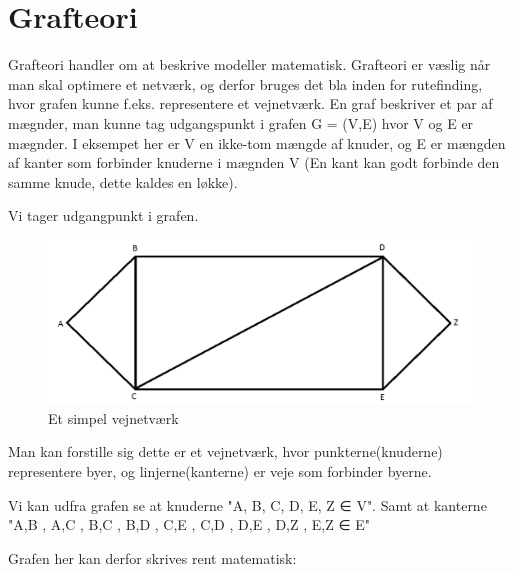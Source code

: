 \section{Grafteori}

Grafteori handler om at beskrive  modeller matematisk. Grafteori er væslig når man skal optimere et netværk, og derfor bruges det bla inden for rutefinding, hvor grafen kunne f.eks. representere et vejnetværk. 
En graf beskriver et par af mægnder, man kunne tag udgangspunkt i grafen G = (V,E) hvor V og E er mægnder. I eksempet her er V en ikke-tom mængde af knuder, og E er mængden af kanter som forbinder knuderne i mægnden V (En kant kan godt forbinde den samme knude, dette kaldes en løkke). 

\vspace{5mm}

Vi tager udgangpunkt i grafen.

\begin{figure}[H]
\begin{adjustbox}{width=1.2\textwidth,center=\textwidth}
\centering
\includegraphics[width=1.2\textwidth]{Pictures/Teoriafsnit/Figurfiler/Grafteori_graf.png}
\end{adjustbox}
\caption{Et simpel vejnetværk}
\label{fig:grafteori}
\end{figure}

Man kan forstille sig dette er et vejnetværk, hvor punkterne(knuderne) representere byer, og linjerne(kanterne) er veje som forbinder byerne.

\vspace{5mm}

Vi kan udfra grafen se at knuderne "A, B, C, D, E, Z ∈ V". Samt at kanterne "{A,B} , {A,C} , {B,C} , {B,D} , {C,E} , {C,D} , {D,E} , {D,Z} , {E,Z} ∈ E"

\vspace{5mm}

Grafen her kan derfor skrives rent matematisk:

\vspace{5mm}

